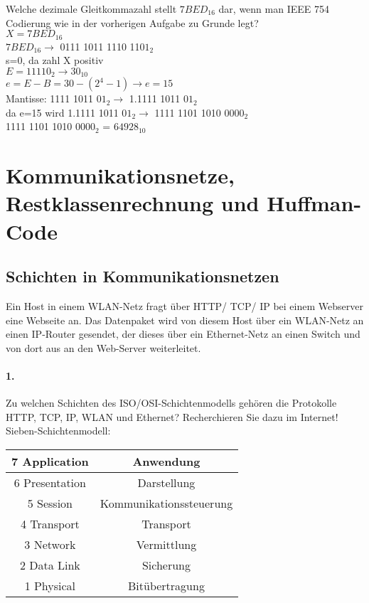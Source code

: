 \documentclass[paper=a4, fontsize=11pt]{scrartcl}
\numberwithin{equation}{section}
\numberwithin{figure}{section}
\numberwithin{table}{section}
\begin{document}
Welche dezimale Gleitkommazahl stellt $7BED_{16}$ dar, wenn man IEEE 754 Codierung wie in der vorherigen Aufgabe zu Grunde legt? \\

$X=7BED_{16}$ \\
$7BED_{16} \rightarrow$ 0111 1011 1110 110$1_{2}$ \\
s=0, da zahl X positiv\\
$E= 11110_{2} \rightarrow 30_{10}$ \\
$e=E-B=30-(2^{4}-1) \rightarrow e=15$ \\
Mantisse: 1111 1011 0$1_{2} \rightarrow$ 1.1111 1011 0$1_{2}$ \\
da e=15 wird 1.1111 1011 0$1_{2} \rightarrow$ 1111 1101 1010 000$0_{2}$ \\
1111 1101 1010 000$0_{2}$ = $64928_{10}$


\section{Kommunikationsnetze, Restklassenrechnung und Huffman-Code}

\subsection{Schichten in Kommunikationsnetzen}
Ein Host in einem WLAN-Netz fragt über HTTP/ TCP/ IP bei einem Webserver eine Webseite an. Das Datenpaket wird von diesem Host über ein WLAN-Netz an einen IP-Router gesendet, der dieses über ein Ethernet-Netz an einen Switch und von dort aus an den Web-Server weiterleitet. \\

\paragraph{1.}
Zu welchen Schichten des ISO/OSI-Schichtenmodells gehören die Protokolle HTTP, TCP, IP, WLAN und Ethernet? Recherchieren Sie dazu im Internet! \\

Sieben-Schichtenmodell: \\
\begin{tabular}{|c|c|}
\hline
7 Application & Anwendung \\
\hline
6 Presentation & Darstellung \\
\hline
5 Session & Kommunikationssteuerung \\
\hline
4 Transport & Transport \\
\hline
3 Network & Vermittlung \\
\hline
2 Data Link & Sicherung \\
\hline
1 Physical & Bitübertragung\\
\hline
\end{tabular}
\end{document}
